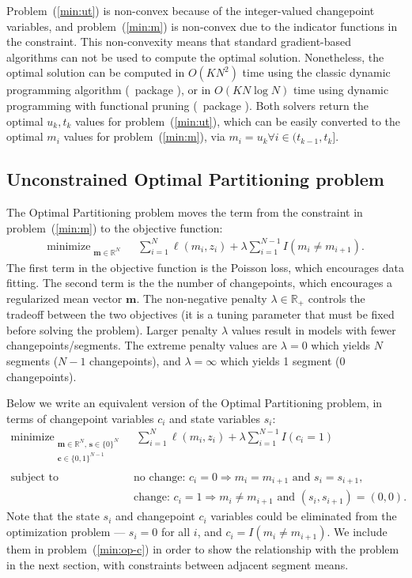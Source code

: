 \documentclass[article]{jss}
\newcommand{\R}{\proglang{R}}
\DeclareMathOperator*{\minimize}{minimize}
\newcommand{\RR}{\mathbb R}
\begin{document}
Problem~(\ref{min:ut}) is non-convex because of the integer-valued
changepoint variables, and problem~(\ref{min:m}) is non-convex due to
the indicator functions in the constraint. This non-convexity means
that standard gradient-based algorithms can not be used to compute the
optimal solution. Nonetheless, the optimal solution can be computed in
$O(KN^2)$ time using the classic dynamic programming algorithm (\R\
package ), or in $O(KN\log N)$ time using dynamic
programming with functional pruning (\R\ package \pkg{jointseg}). Both
solvers return the optimal $u_k,t_k$ values for
problem~(\ref{min:ut}), which can be easily converted to the optimal
$m_i$ values for problem~(\ref{min:m}), via
$m_i=u_k \forall i\in (t_{k-1},t_k]$.

\subsection{Unconstrained Optimal Partitioning problem}

The Optimal Partitioning problem moves the term from the constraint in
problem~(\ref{min:m}) to the objective
function:
\begin{align}
  \label{min:op}
  \minimize_{
  \substack{
  \mathbf m\in\RR^N
  }
  } &\ \ 
      \sum_{i=1}^N \ell(m_i, z_i) + \lambda \sum_{i=1}^{N-1} I(m_i\neq m_{i+1}).
\end{align}
The first term in the objective function is the Poisson loss, which
encourages data fitting. The second term is the the number of
changepoints, which encourages a regularized mean vector $\mathbf
m$. The non-negative penalty $\lambda\in\RR_+$ controls the tradeoff
between the two objectives (it is a tuning parameter that must be
fixed before solving the problem). Larger penalty $\lambda$ values
result in models with fewer changepoints/segments. The extreme penalty
values are $\lambda=0$ which yields $N$ segments ($N-1$ changepoints),
and $\lambda=\infty$ which yields 1 segment (0 changepoints).

Below we write an equivalent version of the Optimal Partitioning
problem, in terms of changepoint variables $c_i$ and state variables
$s_i$:
\begin{align}
  \label{min:op-c}
  \minimize_{
  \substack{
  \mathbf m\in\RR^N,\, \mathbf s\in\{0\}^N\\
  \mathbf c\in\{0,1\}^{N-1}\\
  }
  } &\ \ 
      \sum_{i=1}^N \ell(m_i, z_i) + \lambda \sum_{i=1}^{N-1} I(c_i=1) \\
  \text{subject to\ \ } &\ \text{no change: }c_i = 0 \Rightarrow m_i = m_{i+1}\text{ and } s_i=s_{i+1}, \nonumber\\
    &\ \text{change: }c_i = 1 \Rightarrow m_i \neq m_{i+1}\text{ and }(s_i,s_{i+1})=(0,0).\label{eq:change-constraint}
\end{align}
Note that the state $s_i$ and changepoint $c_i$ variables could be
eliminated from the optimization problem --- $s_i=0$ for all $i$, and 
$c_i=I(m_i\neq m_{i+1})$. We include them in problem~(\ref{min:op-c})
in order to show the relationship with the problem in the next
section, with constraints between adjacent segment means.
\end{document}
